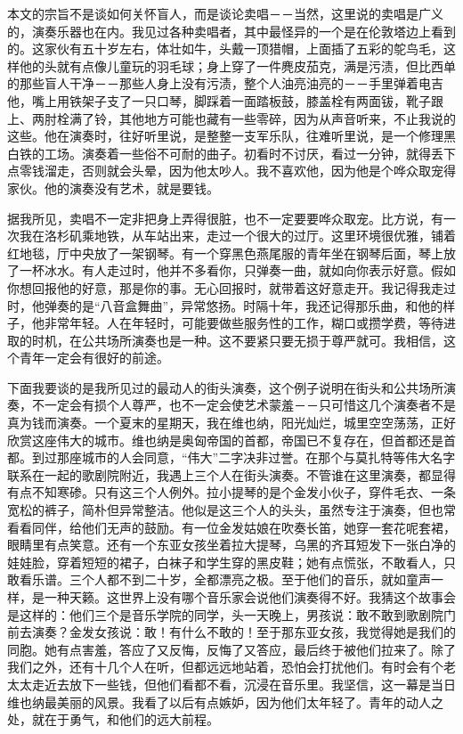 本文的宗旨不是谈如何关怀盲人，而是谈论卖唱－－当然，这里说的卖唱是广义的，演奏乐器也在内。我见过各种卖唱者，其中最怪异的一个是在伦敦塔边上看到的。这家伙有五十岁左右，体壮如牛，头戴一顶猎帽，上面插了五彩的鸵鸟毛，这样他的头就有点像儿童玩的羽毛球；身上穿了一件麂皮茄克，满是污渍，但比西单的那些盲人干净－－那些人身上没有污渍，整个人油亮油亮的－－手里弹着电吉他，嘴上用铁架子支了一只口琴，脚踩着一面踏板鼓，膝盖栓有两面钹，靴子跟上、两肘栓满了铃，其他地方可能也藏有一些零碎，因为从声音听来，不止我说的这些。他在演奏时，往好听里说，是整整一支军乐队，往难听里说，是一个修理黑白铁的工场。演奏着一些俗不可耐的曲子。初看时不讨厌，看过一分钟，就得丢下点零钱溜走，否则就会头晕，因为他太吵人。我不喜欢他，因为他是个哗众取宠得家伙。他的演奏没有艺术，就是要钱。 

据我所见，卖唱不一定非把身上弄得很脏，也不一定要要哗众取宠。比方说，有一次我在洛杉矶乘地铁，从车站出来，走过一个很大的过厅。这里环境很优雅，铺着红地毯，厅中央放了一架钢琴。有一个穿黑色燕尾服的青年坐在钢琴后面，琴上放了一杯冰水。有人走过时，他并不多看你，只弹奏一曲，就如向你表示好意。假如你想回报他的好意，那是你的事。无心回报时，就带着这好意走开。我记得我走过时，他弹奏的是“八音盒舞曲”，异常悠扬。时隔十年，我还记得那乐曲，和他的样子，他非常年轻。人在年轻时，可能要做些服务性的工作，糊口或攒学费，等待进取的时机，在公共场所演奏也是一种。这不要紧只要无损于尊严就可。我相信，这个青年一定会有很好的前途。 

下面我要谈的是我所见过的最动人的街头演奏，这个例子说明在街头和公共场所演奏，不一定会有损个人尊严，也不一定会使艺术蒙羞－－只可惜这几个演奏者不是真为钱而演奏。一个夏末的星期天，我在维也纳，阳光灿烂，城里空空荡荡，正好欣赏这座伟大的城市。维也纳是奥匈帝国的首都，帝国已不复存在，但首都还是首都。到过那座城市的人会同意，“伟大”二字决非过誉。在那个与莫扎特等伟大名字联系在一起的歌剧院附近，我遇上三个人在街头演奏。不管谁在这里演奏，都显得有点不知寒碜。只有这三个人例外。拉小提琴的是个金发小伙子，穿件毛衣、一条宽松的裤子，简朴但异常整洁。他似是这三个人的头头，虽然专注于演奏，但也常看看同伴，给他们无声的鼓励。有一位金发姑娘在吹奏长笛，她穿一套花呢套裙，眼睛里有点笑意。还有一个东亚女孩坐着拉大提琴，乌黑的齐耳短发下一张白净的娃娃脸，穿着短短的裙子，白袜子和学生穿的黑皮鞋；她有点慌张，不敢看人，只敢看乐谱。三个人都不到二十岁，全都漂亮之极。至于他们的音乐，就如童声一样，是一种天籁。这世界上没有哪个音乐家会说他们演奏得不好。我猜这个故事会是这样的：他们三个是音乐学院的同学，头一天晚上，男孩说：敢不敢到歌剧院门前去演奏？金发女孩说：敢！有什么不敢的！至于那东亚女孩，我觉得她是我们的同胞。她有点害羞，答应了又反悔，反悔了又答应，最后终于被他们拉来了。除了我们之外，还有十几个人在听，但都远远地站着，恐怕会打扰他们。有时会有个老太太走近去放下一些钱，但他们看都不看，沉浸在音乐里。我坚信，这一幕是当日维也纳最美丽的风景。我看了以后有点嫉妒，因为他们太年轻了。青年的动人之处，就在于勇气，和他们的远大前程。

